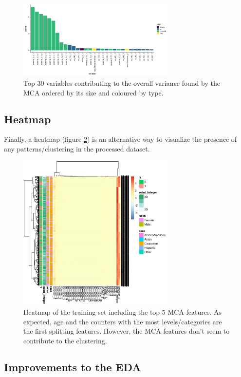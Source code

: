 \documentclass{article}\usepackage[]{graphicx}\usepackage[]{color}
\begin{document}
\begin{figure}[!h]
\centering
\includegraphics[width=0.7\textwidth]{plots/etiqueta_mca_contrib}
\caption{Top 30 variables contributing to the overall variance found by the MCA ordered by its size and coloured by type.}
\label{fig:mca_contrib}
\end{figure}
\subsection{Heatmap}

Finally, a heatmap (figure \ref{fig:heatmap}) is an alternative way to visualize the presence of any patterns/clustering in the processed dataset.

\begin{figure}[!h]
\centering
\includegraphics[width=0.7\textwidth]{plots/heatmap}
\caption{Heatmap of the training set including the top 5 MCA features. As expected, age and the counters with the most levels/categories are the first splitting features. However, the MCA features don't seem to contribute to the clustering.}
\label{fig:heatmap}
\end{figure}

\subsection{Improvements to the EDA}
\end{document}
